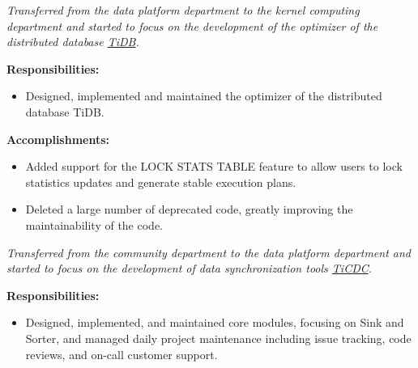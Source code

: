 \documentclass{software_engineer_rustin_liu}
\newcommand{\en}[1]{#1}
\newcommand{\zh}[1]{}
\begin{document}
\en{}
\zh{\datedsubsection{\textbf{\href{https://pingcap.com/zh/}{PingCAP Inc. - 数据库 - 数据库内核研发（Golang/Rust）}}}{2023/08 -- 至今}}
\en{\textsl{Transferred from the data platform department to the kernel computing department and started to focus on the development of the optimizer of the distributed database {\href{https://github.com/pingcap/tidb}{TiDB}}.}}
\zh{\textsl{从数据平台部门转组到计算内核部门，开始专注于分布式数据库 {\href{https://github.com/pingcap/tidb}{TiDB} 优化器的研发。}}}

\en{\textbf{Responsibilities:}}
\zh{\textbf{职责：}}
\begin{itemize}
      \item \en{Designed, implemented and maintained the optimizer of the distributed database TiDB.}
      \zh{设计、实现和维护分布式数据库 TiDB 的优化器。}
\end{itemize}

\en{\textbf{Accomplishments:}}
\zh{\textbf{产出：}}
\begin{itemize}
      \item \en{Added support for the LOCK STATS TABLE feature to allow users to lock statistics updates and generate stable execution plans.}
      \zh{添加 LOCK STATS TABLE 功能，方便用户锁定统计信息的更新，生成稳定的执行计划。}
      \item \en{Deleted a large number of deprecated code, greatly improving the maintainability of the code.}
      \zh{删除了大量弃用功能代码，极大的改善了代码可维护性。}
\end{itemize}

\en{}
\zh{\datedsubsection{\textbf{\href{https://pingcap.com/zh/}{PingCAP Inc. - 数据库 - 数据库工具研发（Golang/Rust）}}}{2021/07 -- 2023/07}}
\en{\textsl{Transferred from the community department to the data platform department and started to focus on the development of data synchronization tools {\href{https://github.com/pingcap/tiflow}{TiCDC}}.}}
\zh{\textsl{从社区部门转组到数据平台部门，开始专注于数据同步工具 {\href{https://github.com/pingcap/tiflow}{TiCDC} 的研发。}}}

\en{\textbf{Responsibilities:}}
\zh{\textbf{职责：}}
\begin{itemize}
      \item \en{Designed, implemented, and maintained core modules, focusing on Sink and Sorter, and managed daily project maintenance including issue tracking, code reviews, and on-call customer support.}
            \zh{设计、实现和维护核心模块，专注于 Sink 和 Sorter，管理项目日常维护，包括 issue 追踪、代码审阅和 on-call 客户支持。}
\end{itemize}
\end{document}
